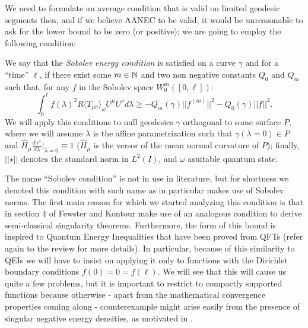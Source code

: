 We need to formulate an average condition that is valid on limited geodesic segments then, and if we believe AANEC to be valid, it would be unreasonable to ask for the lower bound to be zero (or positive); we are going to employ the following condition:

\begin{definition}
	We say that the \emph{Sobolev energy condition} is satisfied on a curve \(\gamma\) and for a ``time'' \(\ell\), if there exist some \(m\in {\mathbb{N}}\) and two non negative constants \(Q_0\) and \(Q_m\) such that, for any \(f\) in the Sobolev space \(W_0^m([0,\ell])\):
    \begin{equation}
        \label{eq:Sobolev-condition}
        \int_0^{\ell} f(\lambda)^2 R\langle T_{\mu\nu}\rangle_{\omega}U^{\mu}U^{\nu} d\lambda \ge -Q_m(\gamma) \vert\vert f^{(m)}\vert\vert^2 - Q_0(\gamma) \vert\vert f\vert\vert^2.
    \end{equation}
	\noindent
	We will apply this conditions to null geodesics \(\gamma\) orthogonal to some surface \(P\), where we will assume \(\lambda\) is the affine parametrization such that \(\gamma(\lambda = 0) \in P\) and \(\hat{H}_{\mu}\frac{d\gamma^{\mu}}{d\lambda}\Big\vert_{\lambda = 0} \equiv 1\) (\(\hat{H}_{\mu}\) is the versor of the mean normal curvature of \(P\)); finally, \(\vert\vert \star \vert\vert\) denotes the standard norm in \(L^2(I)\), and \(\omega\)  asuitable quantum state.
\end{definition}

The name ``Sobolev condition'' is not in use in literature, but for shortness we denoted this condition with such name as in particular makes use of Sobolev norms.
The first main reason for which we started analyzing this condition is that in section \(4\) of \cite{fewster2020new} Fewster and Kontour make use of an analogous condition to derive semi-classical singularity theorems.
Furthermore, the form of this bound is inspired to Quantum Energy Inequalities that have been proved from QFTs (refer again to the review \cite[]{kontou2020energy} for more details). In particular, because of this similarity to QEIs we will have to insist on applying it only to functions with the Dirichlet boundary conditions \(f(0) = 0 = f(\ell) \). We will see that this will cause us quite a few problems, but it is important to restrict to compactly supported functions because otherwise - apart from the mathematical convergence properties coming along - counterexample might arise easily from the presence of singular negative energy densities, as motivated in \cite[]{ford1998quantum}.


